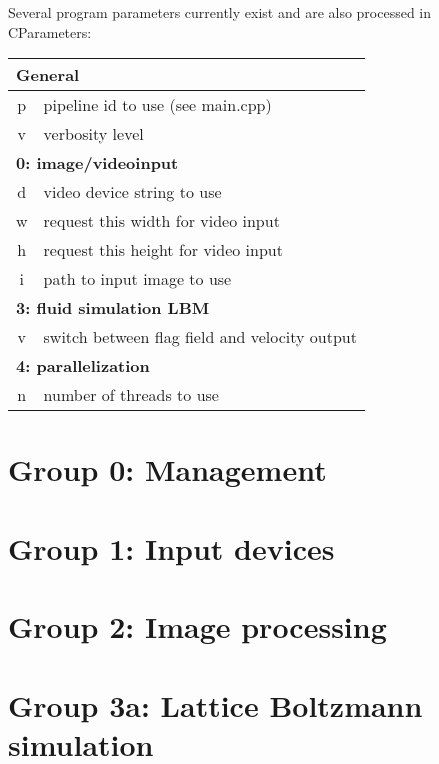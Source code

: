 \documentclass[11pt,a4paper]{article}
\begin{document}
Several program parameters currently exist and are also processed in
CParameters:

\noindent
\begin{tabular}{|c|l|}
	\hline
	\multicolumn{2}{|l|}{\textbf{General}}	\\
	\hline
	p	& pipeline id to use (see main.cpp)	\\
	\hline
	v	& verbosity level	\\
	\hline
	\hline

	\multicolumn{2}{|l|}{\textbf{0: image/videoinput}}	\\
	\hline
	d	& video device string to use\\
	\hline
	w	& request this width for video input\\
	\hline
	h	& request this height for video input\\
	\hline
	i	& path to input image to use\\
	\hline
	\hline

	\multicolumn{2}{|l|}{\textbf{3: fluid simulation LBM}}	\\
	\hline
	v	& switch between flag field and velocity output	\\
	\hline
	\hline
	
	\multicolumn{2}{|l|}{\textbf{4: parallelization}}	\\
	\hline
	n	& number of threads to use\\
	\hline
	\hline

\end{tabular}

\section{Group 0: Management}



\section{Group 1: Input devices}



\section{Group 2: Image processing}



\section{Group 3a: Lattice Boltzmann simulation}

\end{document}
